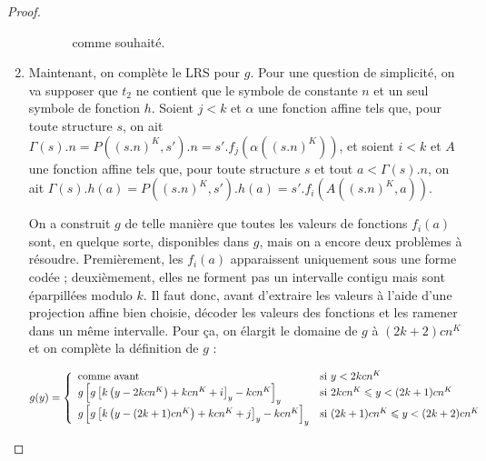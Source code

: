 \documentclass{report}
\begin{document}
\begin{proof}
\begin{enumerate}[itemsep=-1mm,leftmargin=2cm]
\begin{itemize}[itemsep=-1mm, leftmargin=1cm]
\begin{itemize}[itemsep=-1mm,leftmargin=1cm]
									comme souhaité.
							\end{itemize}
					\end{itemize}
					
					
				\item	
					Maintenant, on complète le LRS pour $g$. Pour une question de simplicité, on va supposer que $t_2$ ne contient que le symbole de constante $n$ et un seul symbole de fonction $h$. Soient $j <k$ et $\alpha$ une fonction affine tels que, pour toute structure $s$, on ait $\Gamma(s).n = P\left((s.n)^K, s'\right).n = s'.f_j\left(\alpha\left( (s.n)^K \right)\right)$, et soient $i <k$ et $A$ une fonction affine tels que, pour toute structure $s$ et tout $a < \Gamma(s).n$, on ait $\Gamma(s).h(a) = P\left((s.n)^K, s'\right).h(a) = s'.f_i\left(A\left( (s.n)^K, a \right)\right)$\footnotemark.
					
					
					On a construit $g$ de telle manière que toutes les valeurs de fonctions $f_i(a)$ sont, en quelque sorte, disponibles dans $g$, mais on a encore deux problèmes à résoudre. Premièrement, les $f_i(a)$ apparaissent uniquement sous une forme codée ; deuxièmement, elles ne forment pas un intervalle contigu mais sont éparpillées modulo $k$. Il faut donc, avant d'extraire les valeurs à l'aide d'une projection affine bien choisie, décoder les valeurs des fonctions et les ramener dans un même intervalle. Pour ça, on élargit le domaine de $g$ à $(2k+2)cn^K$ et on complète la définition de $g$ :
					
					\[
						g(y) = \left\lbrace \begin{array}{ll} 
							\text{comme avant} & \text{si $y < 2kcn^K$} \\
							g\left[ g\left[ k\left( y - 2kcn^K \right) + kcn^K  + i\right]_y - kcn^K  \right]_y & \text{si $2kcn^K \leqslant y < (2k+1)cn^K$} \\
							g\left[ g\left[ k\left( y - (2k + 1)cn^K \right) + kcn^K  + j \right]_y - kcn^K  \right]_y & \text{si $(2k+1)cn^K \leqslant y < (2k+2)cn^K$} \\
							 \end{array} \right.
					\]
					

\end{enumerate}
\end{proof}
\end{document}
